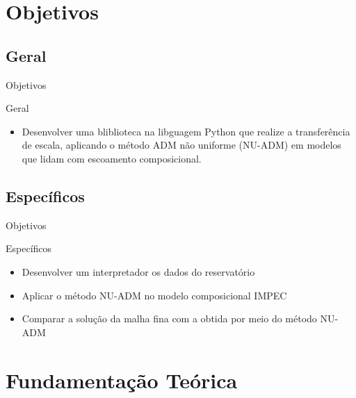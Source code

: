 \documentclass[professionalfont]{beamer}
\begin{document}
\section{Objetivos}

\subsection{Geral}
\begin{frame}{Objetivos}

    \begin{block}{Geral}
        \begin{itemize}
            \item Desenvolver uma bliblioteca na libguagem Python que realize a transferência de escala, aplicando o método ADM não uniforme (NU-ADM) em modelos que lidam com escoamento composicional.
        \end{itemize}
    \end{block}
    
\end{frame}

\subsection{Específicos}
\begin{frame}{Objetivos}
    
    \begin{block}{Específicos}
        \begin{itemize}
            \item Desenvolver um interpretador os dados do reservatório
            \item Aplicar o método NU-ADM no modelo composicional IMPEC
            \item Comparar a solução da malha fina com a obtida por meio do método NU-ADM
        \end{itemize}
    \end{block}
    
\end{frame}

\section{Fundamentação Teórica}
\end{document}
